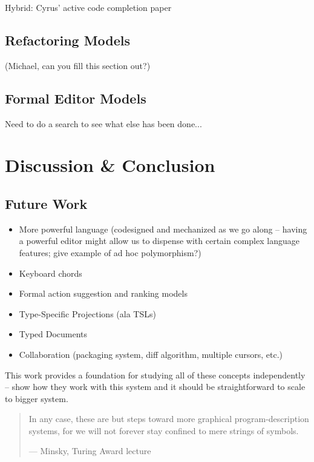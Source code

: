 \documentclass{llncs}
\begin{document}
Hybrid: Cyrus' active code completion paper

\subsection{Refactoring Models}
(Michael, can you fill this section out?)

\subsection{Formal Editor Models}
Need to do a search to see what else has been done...

\section{Discussion \& Conclusion}
\subsection{Future Work}
\begin{itemize}
\item More powerful language (codesigned and mechanized as we go along -- having a powerful editor might allow us to dispense with certain complex language features; give example of ad hoc polymorphism?)
\item Keyboard chords
\item Formal action suggestion and ranking models
\item Type-Specific Projections (ala TSLs)
\item Typed Documents
\item Collaboration (packaging system, diff algorithm, multiple cursors, etc.)
\end{itemize}

This work provides a foundation for studying all of these concepts independently -- show how they work with this system and it should be straightforward to scale to bigger system.

\begin{quote}
In any case, these are but steps toward more graphical program-description systems, for we will not forever stay confined to mere strings of symbols.

--- Minsky, Turing Award lecture
\end{quote}

%
%


\end{document}
